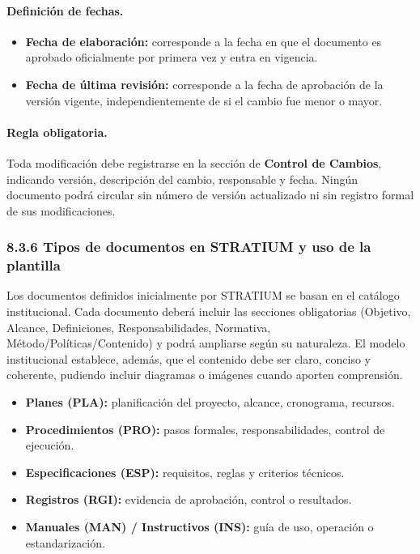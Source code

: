 \documentclass{encabezado}
\begin{document}
\paragraph{Definición de fechas.}

\begin{itemize}
    \item \textbf{Fecha de elaboración:} corresponde a la fecha en que el documento es aprobado oficialmente por primera vez y entra en vigencia.

    \item \textbf{Fecha de última revisión:} corresponde a la fecha de aprobación de la versión vigente, independientemente de si el cambio fue menor o mayor.
\end{itemize}

\paragraph{Regla obligatoria.}

Toda modificación debe registrarse en la sección de \textbf{Control de Cambios}, indicando versión, descripción del cambio, responsable y fecha. Ningún documento podrá circular sin número de versión actualizado ni sin registro formal de sus modificaciones.

\subsubsection*{8.3.6 Tipos de documentos en STRATIUM y uso de la plantilla}

Los documentos definidos inicialmente por STRATIUM se basan en el catálogo institucional. Cada documento deberá incluir las secciones obligatorias (Objetivo, Alcance, Definiciones, Responsabilidades, Normativa, Método/Políticas/Contenido) y podrá ampliarse según su naturaleza. El modelo institucional establece, además, que el contenido debe ser claro, conciso y coherente, pudiendo incluir diagramas o imágenes cuando aporten comprensión.

\begin{itemize}
    \item \textbf{Planes (PLA):} planificación del proyecto, alcance, cronograma, recursos.
    \item \textbf{Procedimientos (PRO):} pasos formales, responsabilidades, control de ejecución.
    \item \textbf{Especificaciones (ESP):} requisitos, reglas y criterios técnicos.
    \item \textbf{Registros (RGI):} evidencia de aprobación, control o resultados.
    \item \textbf{Manuales (MAN) / Instructivos (INS):} guía de uso, operación o estandarización.
\end{itemize}
\end{document}
